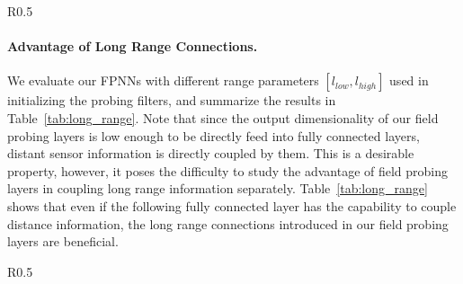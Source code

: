 \documentclass{article}
\begin{document}
\begin{wraptable}{R}{0.5\linewidth}
\vspace{-1.2cm}
	\begin{center}
	\end{center}
	\vspace{-0.3cm}
	\caption{Performance with different filter spans.}
	\label{tab:long_range}
	\vspace{-0.4cm}
\end{wraptable}
\paragraph{Advantage of Long Range Connections.}
We evaluate our FPNNs with different range parameters $[l_{low}, l_{high}]$ used in initializing the probing filters, and summarize the results in Table~\ref{tab:long_range}. Note that since the output dimensionality of our field probing layers is low enough to be directly feed into fully connected layers, distant sensor information is directly coupled by them. This is a desirable property, however, it poses the difficulty to study the advantage of field probing layers in coupling long range information separately. Table~\ref{tab:long_range} shows that even if the following fully connected layer has the capability to couple distance information, the long range connections introduced in our field probing layers are beneficial.

\begin{wraptable}{R}{0.5\linewidth}
\vspace{-0.8cm}
	\begin{center}
	\end{center}
	\vspace{-0.3cm}
	\caption{Performance on different field resolutions.}
	\label{tab:field_resolution}
	\vspace{-0.3cm}
\end{wraptable}
\end{document}
